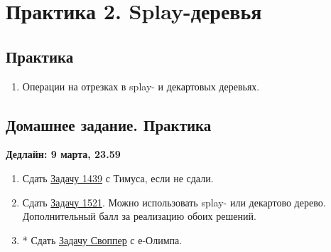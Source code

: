 \section{Практика 2. Splay-деревья}

\subsection{Практика}

\begin{enumerate}

  \item Операции на отрезках в splay- и декартовых деревьях.

\end{enumerate}

\subsection{Домашнее задание. Практика}
\textbf{Дедлайн: 9 марта, 23.59}

\begin{enumerate}

  \item Сдать \href{http://acm.timus.ru/problem.aspx?space=1&num=1439}
{Задачу 1439} с Тимуса, если не сдали.

  \item Сдать \href{http://acm.timus.ru/problem.aspx?space=1&num=1521}
{Задачу 1521}. Можно использовать splay- или декартово дерево. Дополнительный 
  балл за реализацию обоих решений.

  \item* Сдать \href{http://www.e-olimp.com/problems/689}{Задачу Своппер} с 
е-Олимпа.

\end{enumerate}



\clearpage
